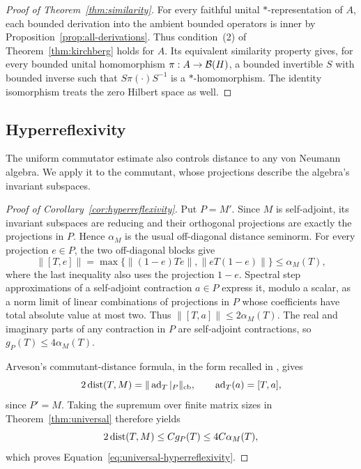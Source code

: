 \begin{proof}[Proof of Theorem~\ref{thm:similarity}]
For every faithful unital $*$-representation of $A$, each bounded
derivation into the ambient bounded operators is inner by
Proposition~\ref{prop:all-derivations}.  Thus condition~(2) of
Theorem~\ref{thm:kirchberg} holds for $A$.  Its equivalent similarity
property gives, for every bounded unital homomorphism
$\pi:A\to\mathcal B(H)$, a bounded invertible $S$ with bounded inverse such
that $S\pi(\cdot)S^{-1}$ is a $*$-homomorphism.
The identity isomorphism treats the zero Hilbert space as well.
\end{proof}

\subsection{Hyperreflexivity}\label{sec:hyperreflexivity}

The uniform commutator estimate also controls distance to any von Neumann
algebra. We apply it to the commutant, whose projections describe the
algebra's invariant subspaces.

\begin{proof}[Proof of Corollary~\ref{cor:hyperreflexivity}]
Put \(P=M'\). Since \(M\) is self-adjoint, its invariant subspaces are
reducing and their orthogonal projections are exactly the projections in
\(P\). Hence \(\alpha_M\) is the usual off-diagonal distance seminorm.
For every projection \(e\in P\), the two off-diagonal blocks give
\[
 \|[T,e]\|=\max\{\|(1-e)Te\|,\|eT(1-e)\|\}\le\alpha_M(T),
\]
where the last inequality also uses the projection \(1-e\).
Spectral step approximations of a self-adjoint contraction \(a\in P\)
express it, modulo a scalar, as a norm limit of linear combinations of
projections in \(P\) whose coefficients have total absolute value at most two.
Thus \(\|[T,a]\|\le2\alpha_M(T)\). The real and imaginary parts of
any contraction in \(P\) are self-adjoint contractions, so
\(g_P(T)\le4\alpha_M(T)\).

Arveson's commutant-distance formula, in the form recalled in
\citet[Equation~(2.1)]{ChristensenSinclairSmithWhite2010}, gives
\[
 2\operatorname{dist}(T,M)=\|\operatorname{ad}_T|_P\|_{\mathrm{cb}},
 \qquad \operatorname{ad}_T(a)=[T,a],
\]
since \(P'=M\). Taking the supremum over finite matrix sizes in
Theorem~\ref{thm:universal} therefore yields
\[
 2\operatorname{dist}(T,M)\le Cg_P(T)\le4C\alpha_M(T),
\]
which proves Equation~\eqref{eq:universal-hyperreflexivity}.
\end{proof}
